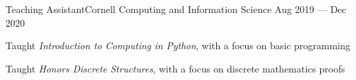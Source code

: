 \documentclass{resume}
\begin{document}
\begin{experience}
    \begin{entry}{Teaching Assistant}{Cornell Computing and Information Science}
        {Aug 2019 --- Dec 2020}
        \begin{description}
            \item Taught \emph{Introduction to Computing in Python}, with a
                focus on basic programming
            \item Taught \emph{Honors Discrete Structures}, with a focus on
                discrete mathematics proofs
        \end{description}
    \end{entry}
\end{experience}
\end{document}
